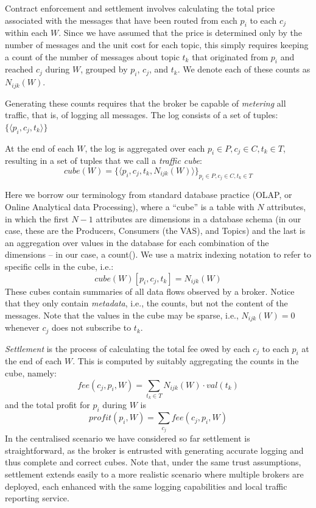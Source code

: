 \documentclass[chi_draft]{sigchi}
\begin{document}
Contract enforcement and settlement involves calculating the total price associated with the messages that have been routed from each $ p_i $ to each $ c_j $ within each $W$.
Since we have assumed that the price is  determined only by the number of messages and the unit cost for each topic, this simply requires keeping a count of the number of messages about topic $t_k$ that originated from $p_i$ and reached $c_j$ during $W$, grouped by $ p_i $, $ c_j $, and $ t_k $.
We denote each of these counts as $N_{ijk}(W)$.

Generating these counts requires that the broker be capable of \textit{metering} all traffic, that is, of logging all messages.
The log consists of a set of tuples:
$ \{\langle p_i, c_j, t_k \rangle  \} $

At the end of each $W$, the log is aggregated over each $p_i \in P, c_j \in C, t_k \in T$, resulting in a set of tuples that we call a \textit{traffic cube}:
\begin{equation}\label{eq:cube}
\mathit{cube}(W) = \{ \langle p_i, c_j, t_k, N_{ijk}(W) \rangle \}_{p_i \in P, c_j \in C, t_k \in T}
\end{equation}

Here we borrow our terminology from standard database practice (OLAP, or Online Analytical data Processing), where a  ``cube'' is a table with $ N $ attributes, in which the first $ N-1 $ attributes are  dimensions in a database schema (in our case, these are the Producers, Consumers (the VAS), and Topics) and the last is an aggregation over values in the database for each combination of the dimensions -- in our case, a count().
We use a matrix indexing notation to refer to specific cells in the cube, i.e.:
\[ \mathit{cube}(W)[p_i, c_j, t_k] = N_{ijk}(W) \] 
These cubes contain summaries of all data flows observed by a broker. Notice that they only contain \textit{metadata}, i.e., the counts, but not the content of the messages.
%
Note that the values in the cube may be sparse, i.e., $N_{ijk}(W) = 0$ whenever $c_j$ does not subscribe to $t_k$.

\textit{Settlement} is the process of calculating the total fee owed by each $ c_j $ to each $ p_i $ at the end of each $W$.
This is computed by suitably aggregating the counts in the cube, namely:
\begin{equation}
\mathit{fee}(c_j, p_i, W) = \sum_{t_k \in T} N_{ijk}(W) \cdot \mathit{val}(t_k)
\label{eq:balance}
\end{equation}
and the total profit for $ p_i  $ during $W$ is
\begin{equation}
\mathit{profit}(p_i, W) = \sum_{c_j} \mathit{fee}(c_j, p_i, W)
\label{eq:reward}
\end{equation}
In the centralised scenario we have considered so far settlement is straightforward, as the broker is entrusted with generating accurate logging and thus complete and correct cubes.
Note that, under the same trust assumptions, settlement extends easily to a more realistic scenario where multiple brokers are deployed, each enhanced with the same logging capabilities and local traffic reporting service.
\end{document}
